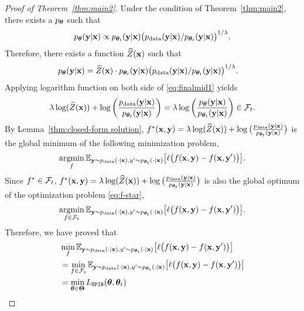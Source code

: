 \documentclass{article}
\newcommand{\method}{\texttt{SPIN}}
\begin{document}
\begin{proof}[Proof of Theorem~\ref{thm:main2}] Under the condition of Theorem~\ref{thm:main2}, there exists a $p_{\bm{\theta}}$ such that 
\begin{align*}
p_{\bm{\theta}}(\mathbf{y}|\mathbf{x}) \propto p_{\bm{\theta}_{t}}(\mathbf{y}|\mathbf{x})\big(p_{\mathrm{data}}(\mathbf{y}|\mathbf{x})/p_{\bm{\theta}_{t}}(\mathbf{y}|\mathbf{x}) \big)^{1/\lambda}. 
\end{align*}
Therefore, there exists a function $\widehat{Z}(\mathbf{x})$ such that 
\begin{align}
&p_{\bm{\theta}}(\mathbf{y}|\mathbf{x}) = \widehat{Z}(\mathbf{x}) \cdot p_{\bm{\theta}_{t}}(\mathbf{y}|\mathbf{x})\big(p_{\mathrm{data}}(\mathbf{y}|\mathbf{x})/p_{\bm{\theta}_{t}}(\mathbf{y}|\mathbf{x}) \big)^{1/\lambda}. \label{eq:finalmid1}
\end{align}
Applying logarithm function on both side of \eqref{eq:finalmid1} yields
\begin{align*}
\lambda \log(\widehat{Z}(\mathbf{x})) + \log\bigg(\frac{p_{\mathrm{data}}(\mathbf{y}|\mathbf{x})}{p_{\bm{\theta}_{t}}(\mathbf{y}|\mathbf{x})}\bigg) = \lambda\log\bigg(\frac{p_{\bm{\theta}}(\mathbf{y}|\mathbf{x})}{p_{\bm{\theta}_{t}}(\mathbf{y}|\mathbf{x})}\bigg) \in \mathcal{F}_{t}.    
\end{align*}
By Lemma~\ref{thm:closed-form solution}, $f^{*}(\mathbf{x},\mathbf{y}) = \lambda \log(\widehat{Z}(\mathbf{x})) + \log\big(\frac{p_{\mathrm{data}}(\mathbf{y}|\mathbf{x})}{p_{\bm{\theta}_{t}}(\mathbf{y}|\mathbf{x})}\big)$ is the global minimum of the following minimization problem, 
\begin{align}
\mathop{\mathrm{argmin}}_{f}\mathbb{E}_{\mathbf{y}\sim p_{\mathrm{data}}(\cdot|\mathbf{x}), y'\sim p_{\bm{\theta}_t}(\cdot|\mathbf{x})}\big[ \ell\big(f(\mathbf{x}, \mathbf{y}) - f(\mathbf{x}, \mathbf{y}')\big) 
\big]. \label{eq:problem10}
\end{align}
Since $f^{*} \in \mathcal{F}_{t}$, $f^{*}(\mathbf{x},\mathbf{y}) = \lambda \log(\widehat{Z}(\mathbf{x})) + \log\big(\frac{p_{\mathrm{data}}(\mathbf{y}|\mathbf{x})}{p_{\bm{\theta}_{t}}(\mathbf{y}|\mathbf{x})}\big)$ is also the global optimum of the optimization problem \eqref{eq:f-star}, 
\begin{align*}
\mathop{\mathrm{argmin}}_{f\in \mathcal{F}_t}\mathbb{E}_{\mathbf{y}\sim p_{\mathrm{data}}(\cdot|\mathbf{x}), y'\sim p_{\bm{\theta}_t}(\cdot|\mathbf{x})}\big[ \ell\big(f(\mathbf{x}, \mathbf{y}) - f(\mathbf{x}, \mathbf{y}')\big) 
\big].
\end{align*}
Therefore, we have proved that 
\begin{align}
&\min_{f}\EE_{\yb\sim p_{\mathrm{data}}(\cdot|\xb), y'\sim p_{\btheta_t}(\cdot|\xb)}\big[ \ell\big(f(\xb, \yb) - f(\xb, \yb')\big) 
\big] \notag \\
&= \min_{f\in \cF_t}\EE_{\yb\sim p_{\mathrm{data}}(\cdot|\xb), y'\sim p_{\btheta_t}(\cdot|\xb)}\big[ \ell\big(f(\xb, \yb) - f(\xb, \yb')\big)\big] \notag \\
&= \min_{\btheta \in \bTheta}L_{\method}(\btheta, \btheta_t)

\end{align}
\end{proof}
\end{document}
